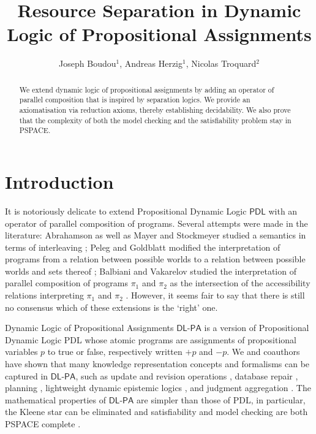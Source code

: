 \documentclass{llncs}
\title{Resource Separation in Dynamic Logic of Propositional Assignments }
\author{Joseph Boudou$^1$, Andreas Herzig$^1$, Nicolas Troquard$^2$}
\institute{IRIT, %
CNRS, France \and %
Free University of Bozen-Bolzano, Italy 
}
\newcommand{\Dlpa}{\ensuremath{\mathsf{DL\text{-}PA}}\xspace}
\newcommand{\Pdl}{\ensuremath{\mathsf{PDL}}\xspace}
\newcommand{\assgntop}[1]{{\mathtt {+} #1}}
\newcommand{\assgnbot}[1]{{\mathtt {-} #1}}
\begin{document}
\maketitle

\begin{abstract}
We extend dynamic logic of propositional assignments by adding an operator of parallel composition that is inspired by separation logics. 
We provide an axiomatisation via reduction axioms, thereby establishing decidability. 
We also prove that the complexity of both the model checking and the satisfiability problem stay in PSPACE.
\end{abstract}


\section{Introduction}

It is notoriously delicate to extend Propositional Dynamic Logic \Pdl with an operator of parallel composition of programs. 
Several attempts were made in the literature:
Abrahamson as well as Mayer and Stockmeyer studied a semantics in terms of interleaving \cite{Abrahamson80,MayerS96}; 
Peleg and Goldblatt modified the interpretation of programs from a relation between possible worlds to a relation between
possible worlds and sets thereof \cite{Peleg87,Goldblatt92}; 
Balbiani and Vakarelov studied the interpretation of parallel composition of programs $\pi_1$ and $\pi_2$ as 
the intersection of the accessibility relations interpreting $\pi_1$ and $\pi_2$ \cite{BalbianiV03}. 
However, it seems fair to say that there is still no consensus which of these extensions is the `right' one. 

Dynamic Logic of Propositional Assignments \Dlpa \cite{BalbianiHerzigTroquard-Lics13,BalbianiHST14} 
is a version of Propositional Dynamic Logic PDL whose atomic programs are 
assignments of propositional variables $p$ to true or false, respectively written $\assgntop p$ and $\assgnbot p$. 
We and coauthors have shown that many knowledge representation concepts and formalisms can be captured in \Dlpa, such as 
update and revision operations \cite{Herzig-Kr14}, 
database %
repair 
\cite{%
FeuilladeHR19}, 
planning \cite{HerzigEtal-Ecai14,HerzigEtal-Ijcai19},
lightweight dynamic epistemic logics \cite{DBLP:conf/atal/CharrierS15,CooperHMMR16,DBLP:conf/atal/CharrierS17}, and
judgment aggregation \cite{DBLP:journals/logcom/NovaroGH18}. 
The mathematical properties of \Dlpa are simpler than those of PDL, in particular, 
the Kleene star can be eliminated \cite{BalbianiHerzigTroquard-Lics13} and 
satisfiability and model checking are both PSPACE complete \cite{BalbianiHST14}. 
\end{document}
